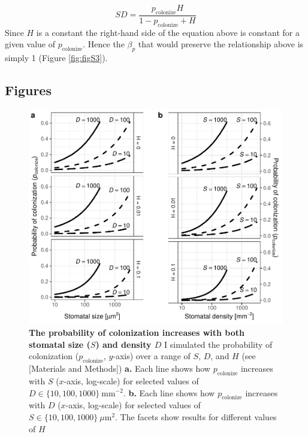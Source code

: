 \documentclass[utf8]{frontiersSCNS}
\begin{document}
\[SD = \frac{p_\text{colonize} H}{1 - p_\text{colonize} + H}\] Since
\(H\) is a constant the right-hand side of the equation above is
constant for a given value of \(p_\text{colonize}\). Hence the
\(\beta_p\) that would preserve the relationship above is simply 1
(Figure \ref{fig:figS3}).

\hypertarget{figures}{%
\subsection*{Figures}\label{figures}}

\begin{figure}
  \centering
    \includegraphics{../figures/figS1.pdf}
    \caption{\textbf{The probability of colonization increases with both stomatal size ($S$) and density $D$} I simulated the probability of colonization ($p_\text{colonize}$, $y$-axis) over a range of $S$, $D$, and $H$ (see [Materials and Methods]) \textbf{a.} Each line shows how $p_\text{colonize}$ increases with $S$ ($x$-axis, log-scale) for selected values of $D \in \{10, 100, 1000\}~\text{mm}^{-2}$. \textbf{b.} Each line shows how $p_\text{colonize}$ increases with $D$ ($x$-axis, log-scale) for selected values of $S \in \{10, 100, 1000\}~\mu\text{m}^2$. The facets show results for different values of $H$}
    \label{fig:figS1}
\end{figure}
\end{document}

